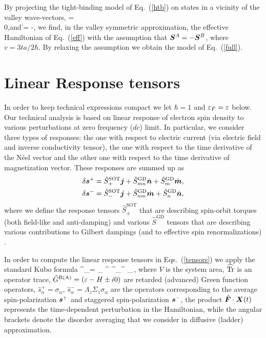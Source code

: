 By projecting the tight-binding model of Eq.~(\ref{htb}) on states in a vicinity of the valley wave-vectors,
\be
{}= \\ 0\epm,\quad\mbox{and}\quad {}'= -,
\e
we find, in the valley symmetric approximation, the effective Hamiltonian of Eq.~(\ref{eff}) with the assumption that $\boldsymbol{S}^A=-\boldsymbol{S}^B$, where $v = 3ta/2\hbar$. By relaxing the assumption we obtain the model of Eq.~(\ref{full}).

\section{Linear Response tensors}\label{sec:appb}
\label{app:vertexcorrections}
In order to keep technical expressions compact we let $\hbar=1$ and $\varepsilon_F=\varepsilon$ below. Our technical analysis is based on linear response of electron spin density to various perturbations at zero frequency ($dc$) limit. In particular, we consider three types of responses: the one with respect to electric current (via electric field and inverse conductivity tensor), the one with respect to the time derivative of the N\'eel vector 
and the other one with respect to the time derivative of magnetization vector. These responses are summed up as
\beml
\label{tensors}
\begin{align}
\delta\boldsymbol{s}^+=\hat{S}^\textrm{SOT}_+\boldsymbol{j} +\hat{S}^\textrm{GD}_{mn} \dot{\boldsymbol{n}}+\hat{S}^\textrm{GD}_m\dot{\boldsymbol{m}},\\
\delta\boldsymbol{s}^-=\hat{S}^\textrm{SOT}_-\boldsymbol{j}+\hat{S}^\textrm{GD}_{nm}\dot{\boldsymbol{m}}+\hat{S}^\textrm{GD}_n \dot{\boldsymbol{n}},
\end{align}
\eml
where we define the response tensors $\hat{S}^\textrm{SOT}_\pm$ that are describing spin-orbit torques (both field-like and anti-damping) and various $\hat{S}^\textrm{GD}$ tensors that are describing various contributions to Gilbert dampings (and to effective spin renormalizations) \cite{AdoSTTGD2019}.

In order to compute the linear response tensors in Eqs.~(\ref{tensors}) we apply the standard Kubo formula
\be
\label{eq:kubo}
\delta{}^\pm_\alpha = 
\s_\beta \widehat{\tr}  \lt\la {}^ ^\pm_\alpha {}^  
_\beta \rt\ra \,,
\e
where $V$ is the system area, $\widehat{\operatorname{Tr}}$ is an operator trace, $\hat{G}^\text{R(A)}=(\varepsilon-H\pm i 0)$ are retarded (advanced) Green function operators, $\hat{s}_\alpha^+ = \sigma_\alpha$, $\hat{s}_\alpha^-=\Lambda_z\Sigma_z\sigma_\alpha$ are the operators corresponding to the average spin-polarization $\boldsymbol{s}^+$ and staggered spin-polarization $\boldsymbol{s}^-$, the product $\hat{\boldsymbol{F}}\cdot \boldsymbol{X}(t)$ represents the time-dependent perturbation in the Hamiltonian, while the angular brackets denote the disorder averaging that we consider in diffusive (ladder) approximation.

